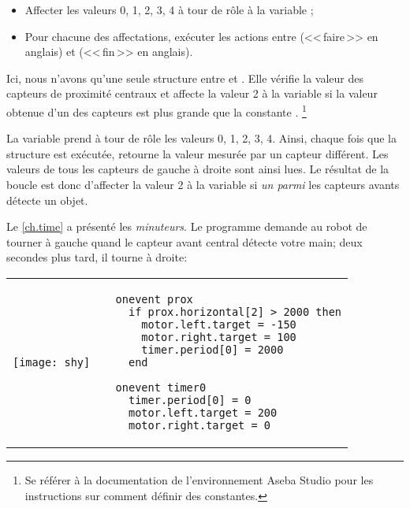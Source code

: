 \begin{itemize}
\item Affecter les valeurs 0, 1, 2, 3, 4 à tour de rôle à la variable ;
\item Pour chacune des affectations, exécuter les actions entre  (<<\,faire\,>> en anglais)
    et  (<<\,fin\,>> en anglais).
\end{itemize}

Ici, nous n'avons qu'une seule structure  entre  et .
Elle vérifie la valeur des capteurs de proximité centraux et affecte la valeur 2 à la variable
 si la valeur obtenue d'un des capteurs est plus grande que la constante .
\footnote{Se référer à la documentation de l'environnement Aseba Studio pour les instructions
sur comment définir des constantes.}

La variable  prend à tour de rôle les valeurs 0, 1, 2, 3, 4.
Ainsi, chaque fois que la structure  est exécutée,  retourne
la valeur mesurée par un capteur différent. Les valeurs de tous les capteurs de gauche à droite
sont ainsi lues.
Le résultat de la boucle  est donc d'affecter la valeur 2 à la variable 
si \emph{un parmi} les capteurs avants détecte un objet.


Le \cref{ch.time} a présenté les \emph{minuteurs}.
Le programme  demande au robot de tourner à gauche quand le capteur avant central
détecte votre main; deux secondes plus tard, il tourne à droite:

\begin{center}
\begin{tabular}{ll}
\texttt{[image: shy]} &
\begin{minipage}[b]{.5\textwidth}
\begin{footnotesize}
\begin{verbatim}
  onevent prox
    if prox.horizontal[2] > 2000 then
      motor.left.target = -150
      motor.right.target = 100
      timer.period[0] = 2000
    end
  
  onevent timer0
    timer.period[0] = 0
    motor.left.target = 200
    motor.right.target = 0
\end{verbatim}
\end{footnotesize}
\end{minipage}
\end{tabular}
\end{center}

